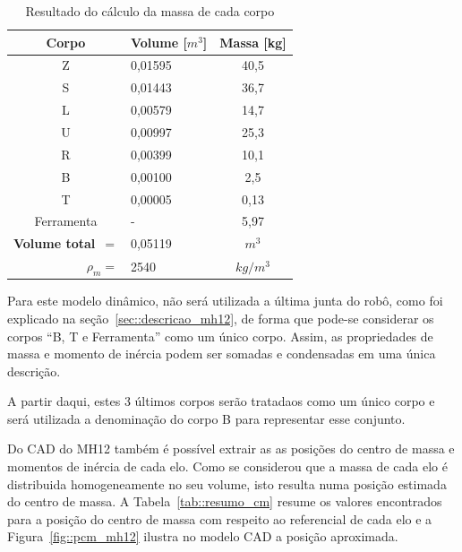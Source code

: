 \begin{table}[h]
\centering
\caption{Resultado do cálculo da massa de cada corpo}
\label{tab::massa_mh12}
\begin{tabular}{@{}clc@{}}
\toprule
\textbf{Corpo}                      & \textbf{Volume} [$m^3$] & \multicolumn{1}{l}{\textbf{Massa} [kg]} \\ \midrule 
Z 									& 0,01595         & 40,5							   \\
S                                   & 0,01443         & 36,7                               \\
L                                   & 0,00579         & 14,7                               \\
U                                   & 0,00997         & 25,3                               \\
R                                   & 0,00399         & 10,1                               \\
B                                   & 0,00100         & 2,5                                \\
T                                   & 0,00005         & 0,13                               \\
Ferramenta                          & -		          & 5,97							   \\ \midrule
\textbf{Volume total}~$=$           & 0,05119        & \multicolumn{1}{c}{$m^3$}	       \\
\multicolumn{1}{r}{\textbf{$\rho_m =$}} & 2540          &
\multicolumn{1}{c}{$kg/{m^3}$}     \\ \bottomrule
\end{tabular}
\end{table}
%

Para este modelo dinâmico, não será utilizada a última junta do robô, como foi
explicado na seção~\ref{sec::descricao_mh12}, de forma que pode-se considerar os
corpos ``B, T e Ferramenta'' como um único corpo. Assim, as propriedades de
massa e momento de inércia podem ser somadas e condensadas em uma única
descrição. 

A partir daqui, estes 3 últimos corpos serão tratadaos como um único corpo e
será utilizada a denominação do corpo B para representar esse conjunto.

Do CAD do MH12 também é possível extrair as as posições do centro de massa e
momentos de inércia de cada elo.
Como se considerou que a massa de cada elo é distribuida homogeneamente no seu
volume, isto resulta numa posição estimada do centro de massa. A
Tabela~\ref{tab::resumo_cm} resume os valores encontrados para a posição do
centro de massa com respeito ao referencial de cada elo e a
Figura~\ref{fig::pcm_mh12} ilustra no modelo CAD a posição aproximada.

